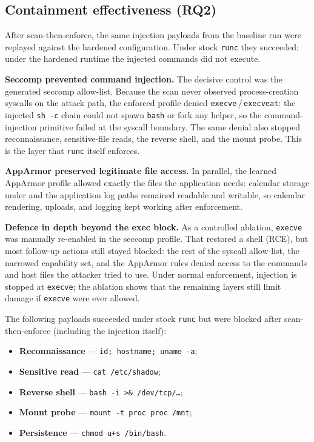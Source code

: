 \subsection{Containment effectiveness (RQ2)}

After scan-then-enforce, the same injection payloads from the baseline run were replayed against the hardened configuration. Under stock \texttt{runc} they succeeded; under the hardened runtime the injected commands did not execute.

\textbf{Seccomp prevented command injection.} The decisive control was the generated seccomp allow-list. Because the scan never observed process-creation syscalls on the attack path, the enforced profile denied \texttt{execve}\,/\,\texttt{execveat}: the injected \texttt{sh -c} chain could not spawn \texttt{bash} or fork any helper, so the command-injection primitive failed at the syscall boundary. The same denial also stopped reconnaissance, sensitive-file reads, the reverse shell, and the mount probe. This is the layer that \texttt{runc} itself enforces.

\textbf{AppArmor preserved legitimate file access.} In parallel, the learned AppArmor profile allowed exactly the files the application needs: calendar storage under  and the application log paths remained readable and writable, so calendar rendering, uploads, and logging kept working after enforcement.

\textbf{Defence in depth beyond the exec block.} As a controlled ablation, \texttt{execve} was manually re-enabled in the seccomp profile. That restored a shell (RCE), but most follow-up actions still stayed blocked: the rest of the syscall allow-list, the narrowed capability set, and the AppArmor rules denied access to the commands and host files the attacker tried to use. Under normal enforcement, injection is stopped at \texttt{execve}; the ablation shows that the remaining layers still limit damage if \texttt{execve} were ever allowed.

The following payloads succeeded under stock \texttt{runc} but were blocked after scan-then-enforce (including the injection itself):

\begin{itemize}
    \item \textbf{Reconnaissance} --- \texttt{id; hostname; uname -a};
    \item \textbf{Sensitive read} --- \texttt{cat /etc/shadow};
    \item \textbf{Reverse shell} --- \texttt{bash -i >\& /dev/tcp/\ldots};
    \item \textbf{Mount probe} --- \texttt{mount -t proc proc /mnt};
    \item \textbf{Persistence} --- \texttt{chmod u+s /bin/bash}.
\end{itemize}

